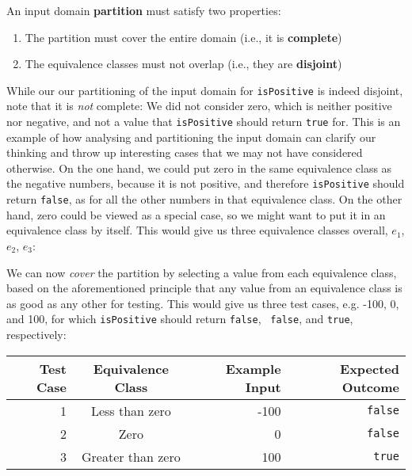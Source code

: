 
An input domain {\bf partition} must satisfy two properties:


\begin{enumerate}
    \item The partition must cover the entire domain (i.e., it is {\bf complete}) 
    \item The equivalence classes must not overlap (i.e., they are {\bf disjoint})
\end{enumerate}


While our our partitioning of the input domain for {\tt isPositive} is indeed
disjoint, note that it is {\it not} complete: We did not consider zero, which is
neither positive nor negative, and not a value that {\tt isPositive} should
return {\tt true} for. This is an example of how analysing and partitioning the
input domain can clarify our thinking and throw up interesting cases that we may
not have considered otherwise. 
%
On the one hand, we could put zero in the same equivalence class as the negative
numbers, because it is not positive, and therefore {\tt isPositive} should
return {\tt false}, as for all the other numbers in that equivalence class. On
the other hand, zero could be viewed as a special case, so we might want to put
it in an equivalence class by itself. This would give us three equivalence
classes overall, $e_1$, $e_2$, $e_3$:




We can now {\it cover} the partition by selecting a value from each equivalence class,
based on the aforementioned principle that any value from an equivalence class
is as good as any other for testing. This would give us three test cases, e.g.
-100, 0, and 100, for which {\tt isPositive} should return {\tt false}, {\tt
false}, and {\tt true}, respectively:

\begin{center}
\begin{tabular}{r|crr}
    {\bf Test Case} & {\bf Equivalence Class} & {\bf Example Input} & {\bf Expected Outcome} \\
    \midrule
    1 & Less than zero    & -100 & {\tt false} \\
    2 & Zero              &    0 & {\tt false} \\
    3 & Greater than zero &  100 & {\tt true}  \\
\end{tabular}
\end{center}

